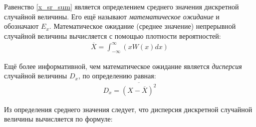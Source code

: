  Равенство \eqref{x_sr_sum} является определением среднего значения дискретной случайной величины. Его ещё называют \textit{математическое ожидание} и обозначают $E_x$.
 Математическое ожидание (среднее значение) непрерывной случайной величины вычисляется с помощью плотности вероятностей:
  \begin{align*} \tag{12b} \label{x_sr_int}
 	\overline X = \int_{ -\infty }^{ \infty } (x W(x) dx)
 \end{align*}
 
 Ещё более информативной, чем математическое ожидание является \textit{дисперсия} случайной величины $D_x$, по определению равная:
 \begin{align} 
 	D_x = \overline{(X - \overline{X})^2}
 \end{align}

Из определения среднего значения следует, что дисперсия дискретной случайной величины вычисляется по формуле: